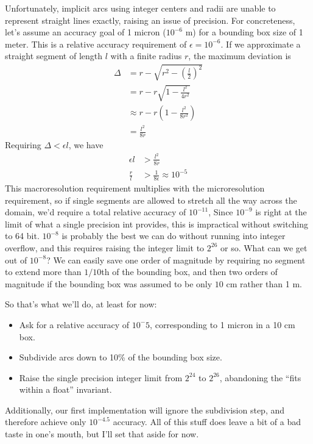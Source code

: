 \documentclass[11pt]{article}
\begin{document}
{Unfortunately, implicit arcs using integer centers and radii are unable to represent straight lines exactly, raising an issue of precision.
For concreteness, let's assume an accuracy goal of 1 micron ($10^{-6}$ m) for a bounding box size of 1 meter.  This is a relative accuracy
requirement of $\epsilon = 10^{-6}$.  If we approximate a straight segment of length $l$ with a finite radius $r$, the maximum deviation is
\begin{align*}
\Delta &= r - \sqrt{r^2 - \left(\frac{l}{2}\right)^2} \\
       &= r - r \sqrt{1 - \frac{l^2}{4 r^2}} \\
       &\approx r - r \left(1 - \frac{l^2}{8 r^2} \right) \\
       &= \frac{l^2}{8 r}
\end{align*}
Requiring $\Delta < \epsilon l$, we have
\begin{align*}
\epsilon l &> \frac{l^2}{8 r} \\
\frac{r}{l} &> \frac{1}{8 \epsilon} \approx 10^{-5}
\end{align*}
This macroresolution requirement multiplies with the microresolution requirement, so if single segments are allowed to stretch all the way
across the domain, we'd require a total relative accuracy of $10^{-11}$,  Since $10^{-9}$ is right at the limit of what a single precision
int provides, this is impractical without switching to 64 bit.  $10^{-8}$ is probably the best we can do without running into integer overflow,
and this requires raising the integer limit to $2^{26}$ or so.  What can we get out of $10^{-8}$?  We can easily save one order of magnitude by
requiring no segment to extend more than $1/10$th of the bounding box, and then two orders of magnitude if the bounding box was assumed to be
only $10$ cm rather than 1 m.

So that's what we'll do, at least for now:
\begin{itemize}
\item Ask for a relative accuracy of $10^-5$, corresponding to 1 micron in a 10 cm box.
\item Subdivide arcs down to 10\% of the bounding box size.
\item Raise the single precision integer limit from $2^{24}$ to $2^{26}$, abandoning the ``fits within a float'' invariant.
\end{itemize}
Additionally, our first implementation will ignore the subdivision step, and therefore achieve only $10^{-4.5}$ accuracy.  All of this stuff
does leave a bit of a bad taste in one's mouth, but I'll set that aside for now.

}
\end{document}
